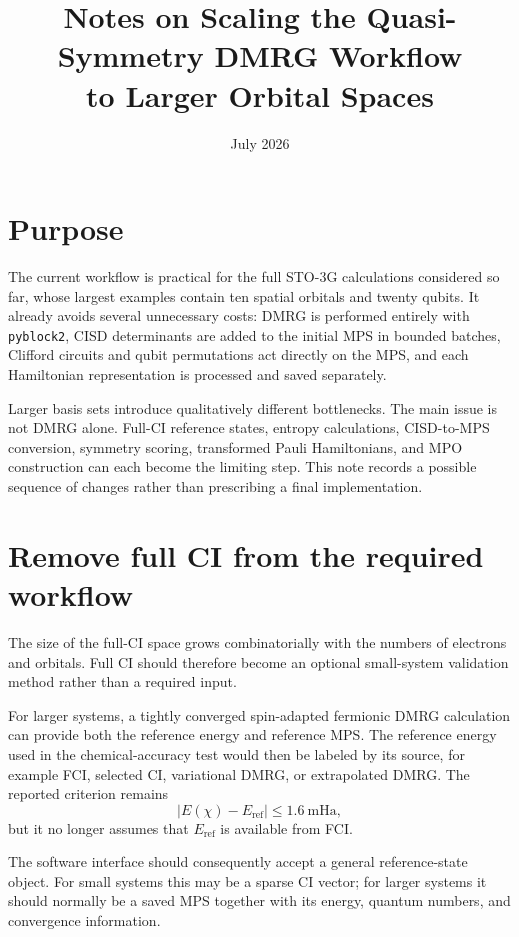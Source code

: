 \documentclass[11pt]{article}
\title{Notes on Scaling the Quasi-Symmetry DMRG Workflow\\
to Larger Orbital Spaces}
\author{}
\date{July 2026}
\begin{document}
\maketitle

\section{Purpose}

The current workflow is practical for the full STO-3G calculations considered
so far, whose largest examples contain ten spatial orbitals and twenty qubits.
It already avoids several unnecessary costs: DMRG is performed entirely with
\texttt{pyblock2}, CISD determinants are added to the initial MPS in bounded
batches, Clifford circuits and qubit permutations act directly on the MPS,
and each Hamiltonian representation is processed and saved separately.

Larger basis sets introduce qualitatively different bottlenecks.  The main
issue is not DMRG alone.  Full-CI reference states, entropy calculations,
CISD-to-MPS conversion, symmetry scoring, transformed Pauli Hamiltonians, and
MPO construction can each become the limiting step.  This note records a
possible sequence of changes rather than prescribing a final implementation.

\section{Remove full CI from the required workflow}

The size of the full-CI space grows combinatorially with the numbers of
electrons and orbitals.  Full CI should therefore become an optional
small-system validation method rather than a required input.

For larger systems, a tightly converged spin-adapted fermionic DMRG
calculation can provide both the reference energy and reference MPS.  The
reference energy used in the chemical-accuracy test would then be labeled by
its source, for example FCI, selected CI, variational DMRG, or extrapolated
DMRG.  The reported criterion remains
\begin{equation}
  \left|E(\chi)-E_{\mathrm{ref}}\right|\leq 1.6\ \mathrm{mHa},
\end{equation}
but it no longer assumes that $E_{\mathrm{ref}}$ is available from FCI.

The software interface should consequently accept a general reference-state
object.  For small systems this may be a sparse CI vector; for larger systems
it should normally be a saved MPS together with its energy, quantum numbers,
and convergence information.
\end{document}
